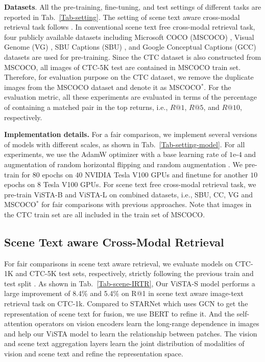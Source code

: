 \documentclass[10pt,twocolumn,letterpaper]{article}
\begin{document}
\noindent\textbf{Datasets}. All the pre-training, fine-tuning, and test settings of different tasks are reported in Tab.~\ref{Tab-setting}. The setting of scene text aware cross-modal retrieval task follows \cite{STARNet}. In conventional scene text free cross-modal retrieval task, four publicly available datasets including Microsoft COCO (MSCOCO) \cite{MSCOCO_dataset}, Visual Genome (VG) \cite{VG_dataset}, SBU Captions (SBU) \cite{SBU_dataset}, and Google Conceptual Captions (GCC) \cite{GCC_dataset} datasets are used for pre-training. Since the CTC dataset is also constructed from MSCOCO, all images of CTC-5K test are contained in MSCOCO train set. Therefore, for evaluation purpose on the CTC dataset, we remove the duplicate images from the MSCOCO dataset and denote it as MSCOCO$^\ast$. For the evaluation metric, all these experiments are evaluated in terms of the percentage of containing a matched pair in the top returns, i.e., $R@1$, $R@5$, and $R@10$, respectively. 

\noindent\textbf{Implementation details.} 
For a fair comparison, we implement several versions of models with different scales, as shown in Tab.~\ref{Tab-setting-model}. For all experiments, we use the AdamW optimizer with a base learning rate of $1$e-$4$ and augmentation of random horizontal flipping and random augmentation \cite{Pixel-BERT}. We pre-train for $80$ epochs on $40$ NVIDIA Tesla V100 GPUs and finetune for another $10$ epochs on $8$ Tesla V100 GPUs. For scene text free cross-modal retrieval task, we pre-train ViSTA-B and ViSTA-L on combined datasets, i.e., SBU, CC, VG and MSCOCO$^\ast$ for fair comparisons with previous approaches. Note that images in the CTC train set are all included in the train set of MSCOCO.




\subsection{Scene Text aware Cross-Modal Retrieval}
For fair comparisons in scene text aware retrieval, we evaluate models on CTC-1K and CTC-5K test sets, respectively, strictly following the previous train and test split \cite{STARNet}.
As shown in Tab.~\ref{Tab-scene-IRTR}, Our ViSTA-S model performs a large improvement of 8.4\% and 5.4\% on R@1 in scene text aware image-text retrieval task on CTC-1k. 
Compared to STARNet \cite{STARNet} which uses GCN to get the representation of scene text for fusion, we use BERT to refine it.
And the self-attention operators on vision encoders learn the long-range dependence in images and help our ViSTA model to learn the relationship between patches.
The vision and scene text aggregation layers learn the joint distribution of modalities of vision and scene text and refine the representation space.
\end{document}
